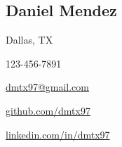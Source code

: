 
\def \locationIcon {\faMapMarker*}
\def \locationText {Dallas, TX}
\def \location {\locationIcon \hspace{5pt}\locationText}

\def \phoneIcon {\faPhone*}
\def \phoneText {123-456-7891}
\def \phone {\phoneIcon \hspace{5pt}\phoneText}

\def \emailIcon {\faEnvelope}
\def \emailText {dmtx97@gmail.com}
\def \emailLink {mailto:dmtx97@gmail.com}
\def \email {\emailIcon \hspace{5pt}\href{\emailLink}{\emailText}}

\def \githubIcon {\faGithub}
\def \githubText {github.com/dmtx97}
\def \githubLink {https://github.com/dmtx97}
\def \github {\githubIcon \hspace{5pt}\href{\githubLink}{\githubText}}

\def \linkedinIcon {\faLinkedin}
\def \linkedinLink {https://www.linkedin.com/in/dmtx97/}
\def \linkedinText {linkedin.com/in/dmtx97}
\def \linkedin {\linkedinIcon \hspace{5pt}\href{\linkedinLink}{\linkedinText}}

\def \name {Daniel Mendez}

\begin{center}
	\section*{\huge{\name}}

	\begin{headerlinks}
		\item \location
		\item \phone
		\item \email
		\item \github
		\item \linkedin
	\end{headerlinks}
\end{center}

